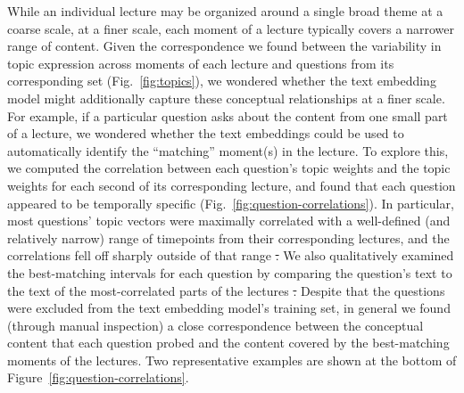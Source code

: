 \documentclass[10pt]{article}
\newcommand{\matchTab}{3} %
\newcommand{\forcesCorrs}{3} %
\newcommand{\bosCorrs}{4} %
\providecommand{\DIFaddtex}[1]{{\protect\color{blue}\uwave{#1}}} %
\providecommand{\DIFdeltex}[1]{{\protect\color{red}\sout{#1}}}                      %
\providecommand{\DIFaddbegin}{} %
\providecommand{\DIFaddend}{} %
\providecommand{\DIFdelbegin}{} %
\providecommand{\DIFdelend}{} %
\providecommand{\DIFadd}[1]{\texorpdfstring{\DIFaddtex{#1}}{#1}} %
\providecommand{\DIFdel}[1]{\texorpdfstring{\DIFdeltex{#1}}{}} %
\newcommand{\DIFscaledelfig}{0.5}
\newlength{\DIFdelgraphicswidth} %
\newlength{\DIFdelgraphicsheight} %
\newcommand{\DIFaddincludegraphics}[2][]{{\color{blue}\fbox{\DIFOincludegraphics[#1]{#2}}}} %
\newcommand{\DIFdelincludegraphics}[2][]{%
\sbox{\DIFdelgraphicsbox}{\DIFOincludegraphics[#1]{#2}}%
\settoboxwidth{\DIFdelgraphicswidth}{\DIFdelgraphicsbox} %
\settoboxtotalheight{\DIFdelgraphicsheight}{\DIFdelgraphicsbox} %
\scalebox{\DIFscaledelfig}{%
\parbox[b]{\DIFdelgraphicswidth}{\usebox{\DIFdelgraphicsbox}\\[-\baselineskip] \rule{\DIFdelgraphicswidth}{0em}}\llap{\resizebox{\DIFdelgraphicswidth}{\DIFdelgraphicsheight}{%
\setlength{\unitlength}{\DIFdelgraphicswidth}%
\begin{picture}(1,1)%
\thicklines\linethickness{2pt} %
{\color[rgb]{1,0,0}\put(0,0){\framebox(1,1){}}}%
{\color[rgb]{1,0,0}\put(0,0){\line( 1,1){1}}}%
{\color[rgb]{1,0,0}\put(0,1){\line(1,-1){1}}}%
\end{picture}%
}\hspace*{3pt}}} %
} %
\DeclareRobustCommand{\DIFaddbegin}{\DIFOaddbegin \let\includegraphics\DIFaddincludegraphics} %
\DeclareRobustCommand{\DIFaddend}{\DIFOaddend \let\includegraphics\DIFOincludegraphics} %
\DeclareRobustCommand{\DIFdelbegin}{\DIFOdelbegin \let\includegraphics\DIFdelincludegraphics} %
\DeclareRobustCommand{\DIFdelend}{\DIFOaddend \let\includegraphics\DIFOincludegraphics} %
\begin{document}
While an individual lecture may be organized around a single broad theme at a
coarse scale, at a finer scale, each moment of a lecture typically covers a
narrower range of content. Given the correspondence we found between the
variability in topic expression across moments of each lecture and questions
from its corresponding set (Fig.~\ref{fig:topics}), we wondered whether the
text embedding model might additionally capture these conceptual relationships
at a finer scale. For example, if a particular question asks about the content
from one small part of a lecture, we wondered whether the text embeddings could
be used to automatically identify the ``matching'' moment(s) in the lecture. To
explore this, we computed the correlation between each question's topic weights
and the topic weights for each second of its corresponding lecture, and found
that each question appeared to be temporally specific
(Fig.~\ref{fig:question-correlations}). In particular, most questions' topic
vectors were maximally correlated with a well-defined (and relatively narrow)
range of timepoints from their corresponding lectures, and the correlations
fell off sharply outside of that range \DIFdelbegin \DIFdel{. }\DIFdelend \DIFaddbegin \DIFadd{(Supp.~Figs.~\forcesCorrs,~\bosCorrs).
}\DIFaddend We also qualitatively examined the best-matching intervals for each question by
comparing the question's text to the text of the most-correlated parts of the
lectures \DIFdelbegin \DIFdel{.
}\DIFdelend \DIFaddbegin \DIFadd{(Supp.~Tab.~\matchTab). }\DIFaddend Despite that the questions were excluded from
the text embedding model's training set, in general we found (through manual
inspection) a close correspondence between the conceptual content that each
question probed and the content covered by the best-matching moments of the
lectures. Two representative examples are shown at the bottom of
Figure~\ref{fig:question-correlations}.
\end{document}
